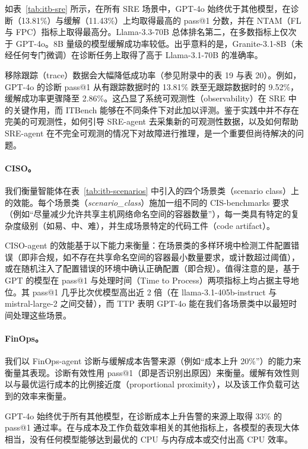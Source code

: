 \documentclass[10pt,UTF8,fontset=fandol]{ctexart}
\begin{document}
如表~\ref{tab:itb-sre} 所示，在所有 SRE 场景中，GPT-4o 始终优于其他模型，在诊断（13.81\%）与缓解（11.43\%）上均取得最高的 pass@1 分数，并在 NTAM（FL 与 FPC）指标上取得最高分。Llama-3.3-70B 总体排名第二，在多数指标上仅次于 GPT-4o。8B 量级的模型缓解成功率较低。出乎意料的是，Granite-3.1-8B（未经任何专门微调）在诊断任务上取得了高于 Llama-3.1-70B 的准确率。

移除跟踪（trace）数据会大幅降低成功率（参见附录中的表 19 与表 20）。例如，GPT-4o 的诊断 pass@1 从有跟踪数据时的 13.81\% 跌至无跟踪数据时的 9.52\%，缓解成功率更骤降至 2.86\%。这凸显了系统可观测性（observability）在 SRE 中的关键作用，而 ITBench 能够在不同条件下对此加以评测。鉴于实践中并不存在完美的可观测性，如何引导 SRE-agent 去采集新的可观测性数据，以及如何帮助 SRE-agent 在不完全可观测的情况下对故障进行推理，是一个重要但尚待解决的问题。

\paragraph{CISO。} 我们衡量智能体在表~\ref{tab:itb-scenarios} 中引入的四个场景类（scenario class）上的效能。每个场景类（\textit{scenario\_class}）施加一组不同的 CIS-benchmarks 要求（例如“尽量减少允许共享主机网络命名空间的容器数量”），每一类具有特定的复杂度级别（如易、中、难），并生成场景特定的代码工件（code artifact）。

CISO-agent 的效能基于以下能力来衡量：在场景类的多样环境中检测工件配置错误（即非合规，如不存在共享命名空间的容器最小数量要求，或计数超过阈值），或在随机注入了配置错误的环境中确认正确配置（即合规）。值得注意的是，基于 GPT 的模型在 pass@1 与处理时间（Time to Process）两项指标上均占据主导地位。其 pass@1 几乎比次优模型高出近 2 倍（在 llama-3.1-405b-instruct 与 mistral-large-2 之间交替），而 TTP 表明 GPT-4o 能在我们各场景类中以最短时间处理这些场景。

\paragraph{FinOps。} 我们以 FinOps-agent 诊断与缓解成本告警来源（例如“成本上升 20\%”）的能力来衡量其表现。诊断有效性用 pass@1（即是否识别出原因）来衡量。缓解有效性则以与最优运行成本的比例接近度（proportional proximity），以及该工作负载可达到的效率来衡量。

GPT-4o 始终优于所有其他模型，在诊断成本上升告警的来源上取得 33\% 的 pass@1 通过率。在与成本及工作负载效率相关的其他指标上，各模型的表现大体相当，没有任何模型能够达到最优的 CPU 与内存成本或交付出高 CPU 效率。
\end{document}
